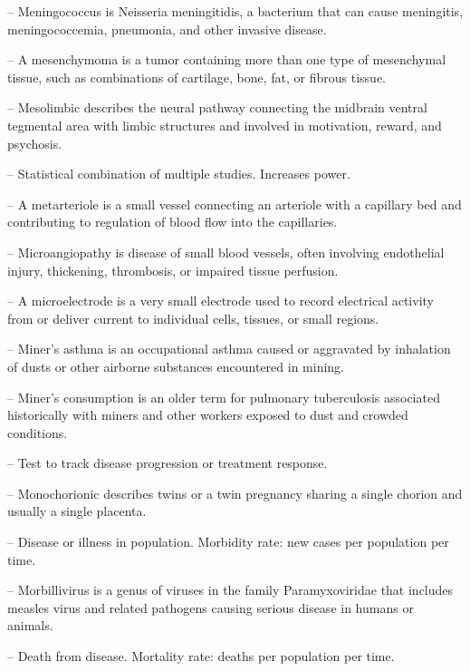 -- Meningococcus is Neisseria meningitidis, a bacterium that can cause meningitis, meningococcemia, pneumonia, and other invasive disease.

-- A mesenchymoma is a tumor containing more than one type of mesenchymal tissue, such as combinations of cartilage, bone, fat, or fibrous tissue.

-- Mesolimbic describes the neural pathway connecting the midbrain ventral tegmental area with limbic structures and involved in motivation, reward, and psychosis.

-- Statistical combination of multiple studies. Increases power.

-- A metarteriole is a small vessel connecting an arteriole with a capillary bed and contributing to regulation of blood flow into the capillaries.

-- Microangiopathy is disease of small blood vessels, often involving endothelial injury, thickening, thrombosis, or impaired tissue perfusion.

-- A microelectrode is a very small electrode used to record electrical activity from or deliver current to individual cells, tissues, or small regions.

-- Miner's asthma is an occupational asthma caused or aggravated by inhalation of dusts or other airborne substances encountered in mining.

-- Miner's consumption is an older term for pulmonary tuberculosis associated historically with miners and other workers exposed to dust and crowded conditions.

-- Test to track disease progression or treatment response.

-- Monochorionic describes twins or a twin pregnancy sharing a single chorion and usually a single placenta.

-- Disease or illness in population. Morbidity rate: new cases per population per time.

-- Morbillivirus is a genus of viruses in the family Paramyxoviridae that includes measles virus and related pathogens causing serious disease in humans or animals.

-- Death from disease. Mortality rate: deaths per population per time.


